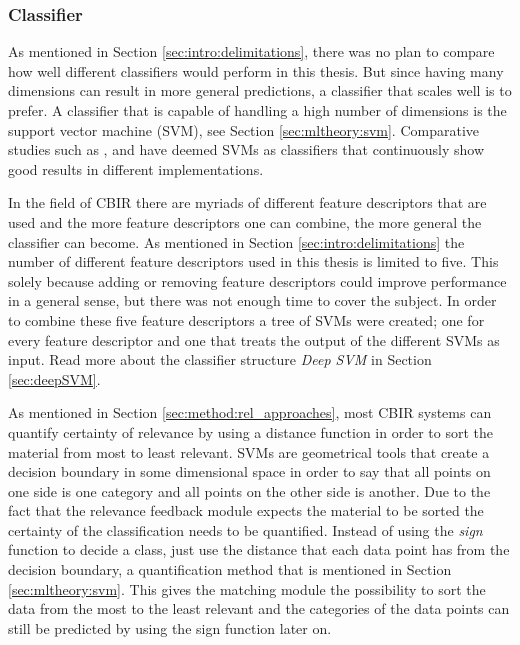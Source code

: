 \subsubsection{Classifier}
\label{sec:method:proposed:matching:classifier}
As mentioned in Section \ref{sec:intro:delimitations}, there was no plan to compare how well different classifiers would perform in this thesis. 
But since having many dimensions can result in more general predictions, a classifier that scales well is to prefer. A classifier that is capable of handling a high number of dimensions is the support vector machine (SVM), see Section \ref{sec:mltheory:svm}. 
Comparative studies such as \cite{IRJET2017classificationMethods}, \cite{SMMR2016comparisionClassificationMethods} and \cite{Informatica2007revClassification} have deemed SVMs as classifiers that continuously show good results in different implementations. 

In the field of CBIR there are myriads of different feature descriptors that are used and the more feature descriptors one can combine, the more general the classifier can become. As mentioned in Section \ref{sec:intro:delimitations} the number of different feature descriptors used in this thesis is limited to five. This solely because adding or removing feature descriptors could improve performance in a general sense, but there was not enough time to cover the subject. In order to combine these five feature descriptors a tree of SVMs were created; one for every feature descriptor and one that treats the output of the different SVMs as input. Read more about the classifier structure \emph{Deep SVM} in Section \ref{sec:deepSVM}. 

As mentioned in Section \ref{sec:method:rel_approaches}, most CBIR systems can quantify certainty of relevance by using a distance function in order to sort the material from most to least relevant. SVMs are geometrical tools that create a decision boundary in some dimensional space in order to say that all points on one side is one category and all points on the other side is another. Due to the fact that the relevance feedback module expects the material to be sorted the certainty of the classification needs to be quantified. Instead of using the \emph{sign} function to decide a class, just use the distance that each data point has from the decision boundary, a quantification method that is mentioned in Section \ref{sec:mltheory:svm}. This gives the matching module the possibility to sort the data from the most to the least relevant and the categories of the data points can still be predicted by using the sign function later on.


